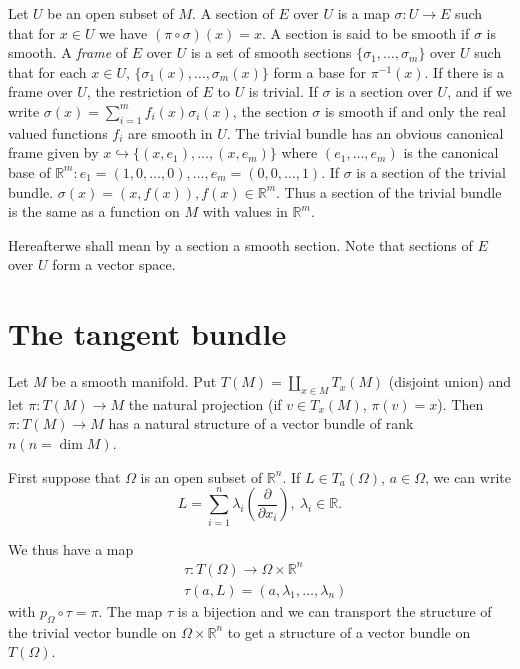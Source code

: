 \begin{itemize}
Let $U$ be an open subset of $M$. A section of $E$ over $U$ is a map $\sigma:U\to E$ such that for $x\in U$ we have $(\pi\circ\sigma)(x)=x$. A section is said to be smooth if $\sigma$ is smooth. A {\em frame} of $E$ over $U$ is a set of smooth sections $\{\sigma_{1},\ldots,\sigma_{m}\}$ over $U$ such that for each $x\in U$, $\{\sigma_{1}(x),\ldots,\sigma_{m}(x)\}$ form a base for $\pi^{-1}(x)$. If there is a frame over $U$, the restriction of $E$ to $U$ is trivial. If $\sigma$ is a section over $U$, and if we write $\sigma(x)=\sum\limits^{m}_{i=1}f_{i}(x)\sigma_{i}(x)$, the section $\sigma$ is smooth if and only the real valued functions $f_{i}$ are smooth in $U$. The trivial bundle has an obvious canonical frame given by $x\hookrightarrow \{(x,e_{1}),\ldots,(x,e_{m})\}$ where $(e_{1},\ldots,e_{m})$ is the canonical base of $\mathbb{R}^{m} : e_{1}=(1,0,\ldots,0),\ldots,e_{m}=(0,0,\ldots,1)$. If $\sigma$ is a section of the trivial bundle. $\sigma(x)=(x,f(x)),f(x)\in \mathbb{R}^{m}$. Thus a section of the trivial bundle is the same as a function on $M$ with values in $\mathbb{R}^{m}$. 
\end{itemize}

Hereafter\pageoriginale we shall mean by a section a smooth section. Note that sections of $E$ over $U$ form a vector space.

\section*{The tangent bundle}

Let $M$ be a smooth manifold. Put $T(M)=\coprod\limits_{x\in M}T_{x}(M)$ (disjoint union) and let $\pi:T(M)\to M$ the natural projection (if $v\in T_{x}(M)$, $\pi(v)=x$). Then $\pi:T(M)\to M$ has a natural structure of a vector bundle of rank $n(n=\dim M)$.

First suppose that $\Omega$ is an open subset of $\mathbb{R}^{n}$. If $L\in T_{a}(\Omega)$, $a\in \Omega$, we can write
$$
L=\sum\limits^{n}_{i=1}\lambda_{i}\left(\dfrac{\partial}{\partial x_{i}}\right), \ \lambda_{i}\in \mathbb{R}.
$$

We thus have a map
\begin{align*}
& \tau : T(\Omega)\to \Omega\times \mathbb{R}^{n}\\[3pt]
& \tau(a,L)=(a,\lambda_{1},\ldots,\lambda_{n})
\end{align*}
with $p_{\Omega}\circ \tau =\pi$. The map $\tau$ is a bijection and we can transport the structure of the trivial vector bundle on $\Omega\times \mathbb{R}^{n}$ to get a structure of a vector bundle on $T(\Omega)$.

